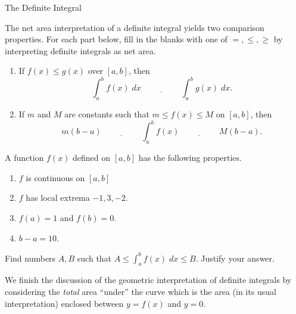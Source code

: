 \documentclass[../main.tex]{subfiles}
\begin{document}
\begin{lesson}{The Definite Integral}
\begin{example}
  \end{example}

  \clearpage

  The net area interpretation of a definite integral yields two comparison properties. For each part below, fill in the blanks with one of \(=, \le , \ge\) by interpreting definite integrals as net area.
  \begin{enumerate}
    \item If \(f(x) \le g(x)\) over \([a,b]\), then
      \[
        \int_{a}^{b} f(x) \;dx \underline{\hspace{2cm}} \int_{a}^{b} g(x) \;dx.
      \]

    \item If \(m\) and \(M\) are constants such that \(m \le f(x) \le M\) on \([a,b]\), then
      \[
        m(b-a) \underline{\hspace{2cm}} \int_{a}^{b} f(x) \underline{\hspace{2cm}} M(b-a).
      \]
  \end{enumerate}

  \begin{example}
    A function \(f(x)\) defined on \([a,b]\) has the following properties. 
    \begin{enumerate}
      \item \(f\) is continuous on \([a,b]\)
      \item \(f\) has local extrema \(-1, 3, -2\). 
      \item \(f(a) = 1\) and \(f(b) = 0\).
      \item \(b - a = 10\).
    \end{enumerate}

    Find numbers \(A,B\) such that \(A \le \int_{a}^{b} f(x) \;dx \le B\). Justify your answer. 
  \end{example}
  \clearpage
 
  We finish the discussion of the geometric interpretation of definite integrals by considering the \emph{total} area ``under'' the curve which is the area (in its usual interpretation) enclosed between \(y = f(x)\) and \(y = 0\).


\end{lesson}
\end{document}
